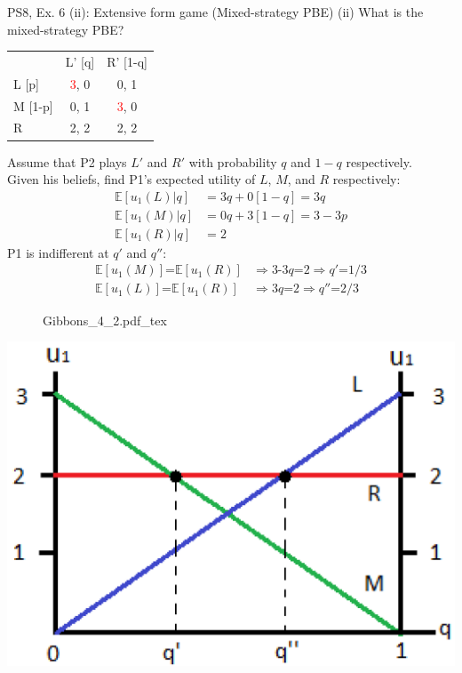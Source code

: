 \begin{frame}{PS8, Ex. 6 (ii): Extensive form game (Mixed-strategy PBE)}
    (ii) What is the mixed-strategy PBE? \vspace{-8pt}
    \begin{multicols}{2}
      \begin{table}
        \begin{tabular}{l|c|c|}
          \multicolumn{1}{c}{} & \multicolumn{1}{c}{L' [q]} & \multicolumn{1}{c}{R' [1-q]} \\\cline{2-3}
          L [p]   & \textcolor{red}{3}, 0 & 0, \color{blue}1 \\\cline{2-3}
          M [1-p] & 0, \color{blue}1 & \textcolor{red}{3}, 0 \\\cline{2-3}
          R       & 2, \color{blue}2 & 2, \color{blue}2 \\\cline{2-3}
        \end{tabular}
      \end{table} \vspace{-4pt}
      Assume that P2 plays $L'$ and $R'$ with probability $q$ and $1-q$ respectively.\\\smallskip
      Given his beliefs, find P1's expected utility of $L$, $M$, and $R$ respectively: \vspace{-4pt}
      \begin{align*}
        \mathbb{E}[u_1(L)|q]&=3q+0[1-q]=3q\\
        \mathbb{E}[u_1(M)|q]&=0q+3[1-q]=3-3p\\
        \mathbb{E}[u_1(R)|q]&=2
      \end{align*}
      P1 is indifferent at $q'$ and $q''$: \vspace{-6pt}
      \begin{align*}
        \mathbb{E}[u_1(M)]\text{=}\mathbb{E}[u_1(R)]&\Rightarrow \text{3-3}q\text{=}2\Rightarrow q'\text{=}1/3\\
        \mathbb{E}[u_1(L)]\text{=}\mathbb{E}[u_1(R)]&\Rightarrow 3q\text{=}2\Rightarrow q''\text{=}2/3
      \end{align*}
      \vfill\null\columnbreak
      \begin{figure}[!h]
        \center {}
        {Gibbons_4_2.pdf_tex}
      \end{figure}
      \includegraphics[width=1.1\columnwidth]{figures/Gibbons_4_2_E[u]}

\end{multicols}
\end{frame}
